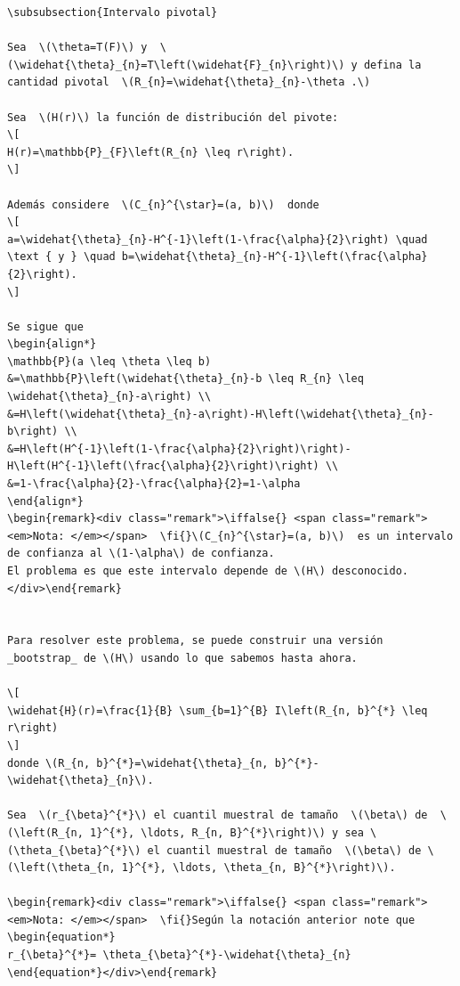 \documentclass[
  12pt,
]{book}
\theoremstyle{definition}
\theoremstyle{definition}
\theoremstyle{definition}
\theoremstyle{remark}
\newtheorem*{remark}{Nota: }
\begin{document}
\begin{verbatim}
\subsubsection{Intervalo pivotal}

Sea  \(\theta=T(F)\) y  \(\widehat{\theta}_{n}=T\left(\widehat{F}_{n}\right)\) y defina la cantidad pivotal  \(R_{n}=\widehat{\theta}_{n}-\theta .\)

Sea  \(H(r)\) la función de distribución del pivote:
\[
H(r)=\mathbb{P}_{F}\left(R_{n} \leq r\right).
\]

Además considere  \(C_{n}^{\star}=(a, b)\)  donde
\[
a=\widehat{\theta}_{n}-H^{-1}\left(1-\frac{\alpha}{2}\right) \quad \text { y } \quad b=\widehat{\theta}_{n}-H^{-1}\left(\frac{\alpha}{2}\right).
\]

Se sigue que
\begin{align*}
\mathbb{P}(a \leq \theta \leq b)
&=\mathbb{P}\left(\widehat{\theta}_{n}-b \leq R_{n} \leq \widehat{\theta}_{n}-a\right) \\
&=H\left(\widehat{\theta}_{n}-a\right)-H\left(\widehat{\theta}_{n}-b\right) \\
&=H\left(H^{-1}\left(1-\frac{\alpha}{2}\right)\right)-H\left(H^{-1}\left(\frac{\alpha}{2}\right)\right) \\
&=1-\frac{\alpha}{2}-\frac{\alpha}{2}=1-\alpha
\end{align*}
\begin{remark}<div class="remark">\iffalse{} <span class="remark"><em>Nota: </em></span>  \fi{}\(C_{n}^{\star}=(a, b)\)  es un intervalo de confianza al \(1-\alpha\) de confianza.
El problema es que este intervalo depende de \(H\) desconocido.
</div>\end{remark}


Para resolver este problema, se puede construir una versión _bootstrap_ de \(H\) usando lo que sabemos hasta ahora.

\[
\widehat{H}(r)=\frac{1}{B} \sum_{b=1}^{B} I\left(R_{n, b}^{*} \leq r\right)
\]
donde \(R_{n, b}^{*}=\widehat{\theta}_{n, b}^{*}-\widehat{\theta}_{n}\).

Sea  \(r_{\beta}^{*}\) el cuantil muestral de tamaño  \(\beta\) de  \(\left(R_{n, 1}^{*}, \ldots, R_{n, B}^{*}\right)\) y sea \(\theta_{\beta}^{*}\) el cuantil muestral de tamaño  \(\beta\) de \(\left(\theta_{n, 1}^{*}, \ldots, \theta_{n, B}^{*}\right)\).

\begin{remark}<div class="remark">\iffalse{} <span class="remark"><em>Nota: </em></span>  \fi{}Según la notación anterior note que
\begin{equation*}
r_{\beta}^{*}= \theta_{\beta}^{*}-\widehat{\theta}_{n}
\end{equation*}</div>\end{remark}




\end{verbatim}
\end{document}

